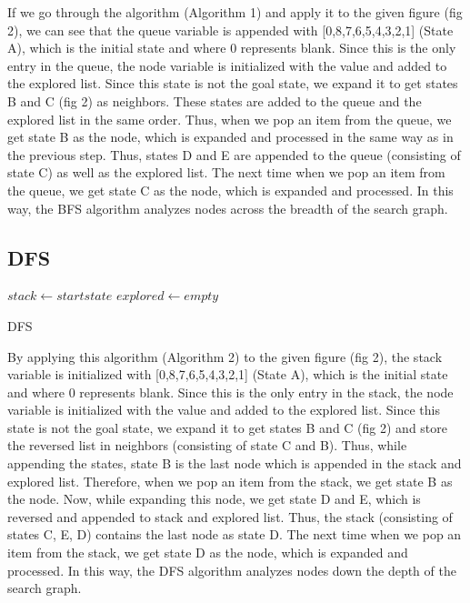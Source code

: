 \documentclass{svproc}
\begin{document}
\noindent If we go through the algorithm (Algorithm 1) and apply it to the given figure (fig 2), we can see that the queue variable is appended with [0,8,7,6,5,4,3,2,1] (State A), which is the initial state and where 0 represents blank. Since this is the only entry in the queue, the node variable is initialized with the value and added to the explored list. Since this state is not the goal state, we expand it to get states B and C (fig 2) as neighbors. These states are added to the queue and the explored list in the same order. Thus, when we pop an item from the queue, we get state B as the node, which is expanded and processed in the same way as in the previous step. Thus, states D and E are appended to the queue (consisting of state C) as well as the explored list. The next time when we pop an item from the queue, we get state C as the node, which is expanded and processed. In this way, the BFS algorithm analyzes nodes across the breadth of the search graph. \\

\subsection{DFS}
\setlength{\intextsep}{5pt}
\begin{algorithm}
	\SetAlgoLined
	$stack \gets start state$\;
	$explored \gets empty$\;
	\caption{DFS}
\end{algorithm}

\noindent By applying this algorithm (Algorithm 2) to the given figure (fig 2), the stack variable is initialized with [0,8,7,6,5,4,3,2,1] (State A), which is the initial state and where 0 represents blank. Since this is the only entry in the stack, the node variable is initialized with the value and added to the explored list. Since this state is not the goal state, we expand it to get states B and C (fig 2) and store the reversed list in neighbors (consisting of state C and B). Thus, while appending the states, state B is the last node which is appended in the stack and explored list. Therefore, when we pop an item from the stack, we get state B as the node. Now, while expanding this node, we get state D and E, which is reversed and appended to stack and explored list. Thus, the stack (consisting of states C, E, D) contains the last node as state D. The next time when we pop an item from the stack, we get state D as the node, which is expanded and processed. In this way, the DFS algorithm analyzes nodes down the depth of the search graph. 
\end{document}

